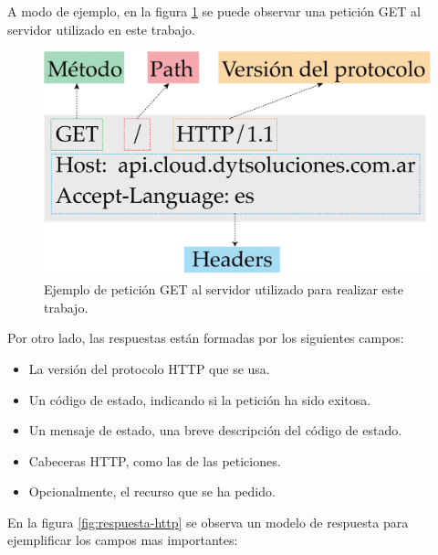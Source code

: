 A modo de ejemplo, en la figura \ref{fig:peticiones-http}  se puede observar una petición GET al servidor utilizado en este trabajo.

\begin{figure}[htpb]
	\centering
	\includegraphics[scale=.50]{./Figures/peticion-http.png}
	\caption[Petición GET al servidor ]{Ejemplo de petición GET al servidor utilizado para realizar este trabajo.}
	\label{fig:peticiones-http}
\end{figure}


Por otro lado, las respuestas están formadas por los siguientes campos:

\begin{itemize}
	\item La versión del protocolo HTTP que se usa.
	
	\item Un código de estado, indicando si la petición ha sido exitosa.
	
	\item Un mensaje de estado, una breve descripción del código de estado.
	
	\item Cabeceras HTTP, como las de las peticiones.
	
	\item Opcionalmente, el recurso que se ha pedido.
	
\end{itemize}

En la figura \ref{fig:respuesta-http}  se observa un modelo de respuesta para ejemplificar los campos mas importantes: 

